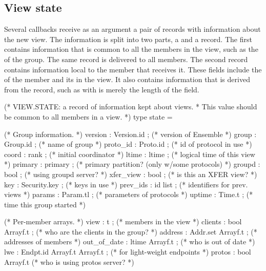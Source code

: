 %
%
%
\subsection{View state}

Several callbacks receive as an argument a pair of records with
information about the new view.  The information is split into two
parts, a  and a  record.  The
first contains information that is common to all the members in the
view, such as the  of the group.  The same record is
delivered to all members.  The second record contains information
local to the member that receives it.  These fields include the
 of the member and its  in the view.  It
also contains information that is derived from the 
record, such as  with is merely the length of the
 field.

\begin{codebox}
(* VIEW.STATE: a record of information kept about views.
 * This value should be common to all members in a view.
 *)
type state = {
  (* Group information.
   *)
  version       : Version.id ;		(* version of Ensemble *)
  group		: Group.id ;		(* name of group *)
  proto_id	: Proto.id ;		(* id of protocol in use *)
  coord         : rank ;		(* initial coordinator *)
  ltime         : ltime ;		(* logical time of this view *)
  primary       : primary ;		(* primary partition? (only w/some protocols) *)
  groupd        : bool ;		(* using groupd server? *)
  xfer_view	: bool ;		(* is this an XFER view? *)
  key		: Security.key ;	(* keys in use *)
  prev_ids      : id list ;             (* identifiers for prev. views *)
  params        : Param.tl ;		(* parameters of protocols *)
  uptime        : Time.t ;		(* time this group started *)

  (* Per-member arrays.
   *)
  view 		: t ;			(* members in the view *)
  clients	: bool Arrayf.t ;	(* who are the clients in the group? *)
  address       : Addr.set Arrayf.t ;	(* addresses of members *)
  out_of_date   : ltime Arrayf.t	; (* who is out of date *)
  lwe           : Endpt.id Arrayf.t Arrayf.t ; (* for light-weight endpoints *)
  protos        : bool Arrayf.t  	(* who is using protos server? *)
}
\end{codebox}


